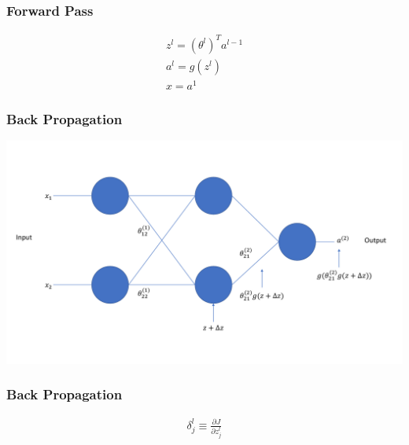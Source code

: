 \documentclass{beamer}
\begin{document}
\begin{frame}
    \frametitle{Forward Pass}

    \begin{gather*}
        z^l = (\theta^l)^T a^{l-1}\\
        a^l = g(z^l)\\
        x = a^1
    \end{gather*}

\end{frame}

\begin{frame}
    \frametitle{Back Propagation}

    \centerline{\includegraphics[scale = .3]{backpropintuition.pdf}}

\end{frame}

\begin{frame}
    \frametitle{Back Propagation}

    \begin{gather*}
        \delta^l_j \equiv \frac{\partial J}{\partial z^{l}_j}\\
    \end{gather*}

\end{frame}
\end{document}

